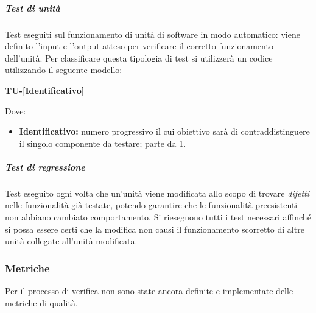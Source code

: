                     \subparagraph*{Test di unità}
                            Test eseguiti sul funzionamento di unità di software in modo automatico: viene definito l'input e l'output atteso per verificare il corretto funzionamento dell'unità.
                            Per classificare questa tipologia di test si utilizzerà un codice utilizzando il seguente modello:     

                            \begin{center}
                            	\textbf{TU-[Identificativo]}
                            \end{center}
                            Dove:
                            
							\begin{itemize}
                            	\item \textbf{Identificativo:} numero progressivo il cui obiettivo sarà di contraddistinguere il singolo componente da testare; parte da 1.
							\end{itemize}
						
                    \subparagraph*{Test di regressione}
        				Test eseguito ogni volta che un'unità viene modificata allo scopo di trovare \textit{difetti} nelle funzionalità già testate, potendo garantire che le funzionalità preesistenti non abbiano cambiato comportamento. Si rieseguono tutti i test necessari affinché si possa essere certi che la modifica non causi il funzionamento scorretto di altre unità collegate all'unità modificata.


                \subsubsection{Metriche}

                Per il processo di verifica non sono state ancora definite e implementate delle metriche di qualità.




